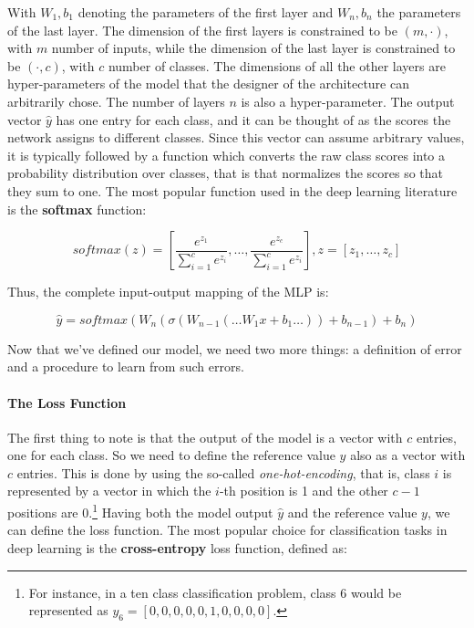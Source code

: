\documentclass[../main.tex]{subfiles}
\begin{document}
    With $W_{1}, b_{1}$ denoting the parameters of the first layer and $W_{n}, b_{n}$ the parameters of the last layer. The dimension of the
    first layers is constrained to be $(m, \cdot)$, with $m$ number of inputs, while the dimension of the last layer is constrained to be
    $(\cdot, c)$, with $c$ number of classes. The dimensions of all the other layers are hyper-parameters of the model that the designer
    of the architecture can arbitrarily chose. The number of layers $n$ is also a hyper-parameter.
    \newline
    The output vector $\hat{y}$ has one entry for each class, and it can be thought of as the scores the network assigns to different classes.
    Since this vector can assume arbitrary values, it is typically followed by a function which converts the raw class scores into a
    probability distribution over classes, that is that normalizes the scores so that they sum to one.
    The most popular function used in the deep learning literature is the \textbf{softmax} function:

    \begin{equation}
        softmax(z) = \left[ \frac{e^{z_{1}}}{\sum_{i = 1}^{c} e^{z_{i}}} , \ldots , \frac{e^{z_{c}}}{\sum_{i = 1}^{c} e^{z_{i}}} \right], z = \left[ z_{1}, \ldots ,z_{c}  \right]
    \end{equation}

    Thus, the complete input-output mapping of the MLP is:

    \begin{equation} \label{eq:MLPequation}
        \hat{y} = softmax(W_{n}(\sigma(W_{n-1}(\ldots W_{1} x + b_{1} \ldots)) + b_{n-1}) + b_{n})
    \end{equation}

    Now that we've defined our model, we need two more things: a definition of error and a procedure to learn from such errors.

    \paragraph{The Loss Function}
    The first thing to note is that the output of the model is a vector with $c$ entries, one for each class. So we need to define the
    reference value $y$ also as a vector with $c$ entries. This is done by using the so-called \textit{one-hot-encoding}, that is, class
    $i$ is represented by a vector in which the $i$-th position is 1 and the other $c - 1$ positions are 0.\footnote{For instance, in a ten class
    classification problem, class 6 would be represented as $y_{6} = \left[ 0, 0, 0, 0, 0, 1, 0, 0, 0, 0 \right] $.} Having both
    the model output $\hat{y}$ and the reference value $y$, we can define the loss function. The most popular choice for classification
    tasks in deep learning is the \textbf{cross-entropy} loss function, defined as:
\end{document}
